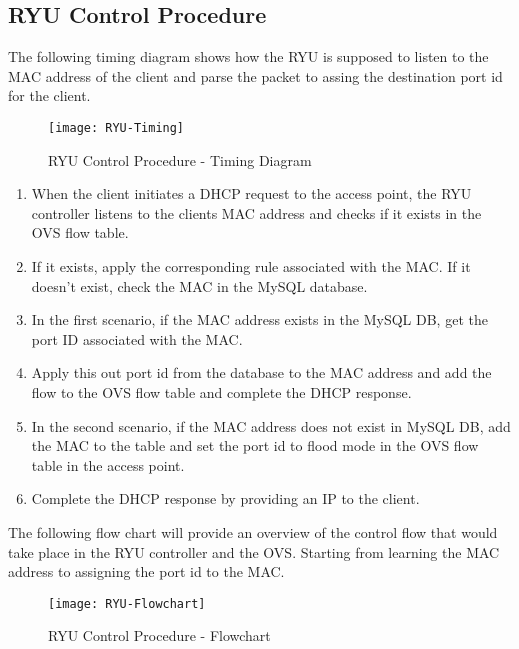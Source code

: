 \subsection{RYU Control Procedure} \label{RYU Control Procedure}
The following timing diagram shows how the RYU is supposed to listen to the MAC address of the client and parse the packet to assing the destination port id for the client.

\begin{figure}[H]
	\centering
	\texttt{[image: RYU-Timing]}
	\caption {RYU Control Procedure - Timing Diagram }
	\label{fig:RYU-Timing}
	\vspace{-10pt}
\end{figure}

\begin{enumerate}
	\item When the client initiates a DHCP request to the access point, the RYU controller listens to the clients MAC address and checks if it exists in the OVS flow table.
	\item If it exists, apply the corresponding rule associated with the MAC. If it doesn’t exist, check the MAC in the MySQL database.
	\item In the first scenario, if the MAC address exists in the MySQL DB, get the port ID associated with the MAC.
	\item Apply this out port id from the database to the MAC address and add the flow to the OVS flow table and complete the DHCP response.
	\item In the second scenario, if the MAC address does not exist in MySQL DB, add the MAC to the table and set the port id to flood mode in the OVS flow table in the access point.
	\item Complete the DHCP response by providing an IP to the client.
	
\end{enumerate}
The following flow chart will provide an overview of the control flow that would take place in the RYU controller and the OVS. Starting from learning the MAC address to assigning the port id to the MAC.

\begin{figure}[H]
	\centering
	\texttt{[image: RYU-Flowchart]}
	\caption {RYU Control Procedure - Flowchart}
	\label{fig:RYU-Flowchart}
	\vspace{-10pt}
\end{figure}

